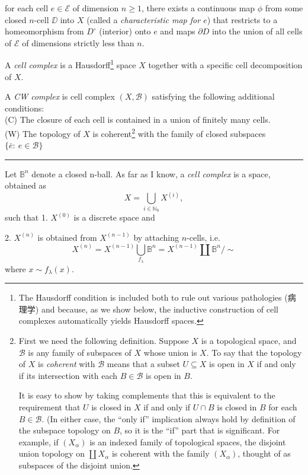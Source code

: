    for each cell $e\in \mathcal{E}$ of dimension $n\geq 1$, there exists a continuous map $\phi$
   from some closed $n$-cell $\DD$ into $X$ (called a {\it characteristic map for $e$}) that restricts to a homeomorphism from $D^{\circ}$ (interior) onto $e$ and maps $\partial D$ into the union of all cells of $\mathcal{E}$ of dimensions strictly less than $n$.\par
   A {\it cell complex} is a Hausdorff\footnote{The Hausdorff condition is included both to rule out various pathologies (病理学) and because, as we show below, the inductive construction of cell complexes automatically yields Hausdorff spaces.} space $X$ together with a specific cell decomposition of $X$.\par
   A {\it CW complex} is cell complex $(X,\mathcal{B})$ satisfying the following additional conditions:\\
   (C) The closure of each cell is contained in a union of finitely many cells.\\
   (W) The topology of $X$ is coherent\footnote{First we need the following definition. Suppose $X$ is a topological space, and $\mathcal{B}$ is any family of subspaces of $X$ whose union is $X$. To say that the topology of $X$ is {\it coherent} with $\mathcal{B}$ means that a subset $U\subseteq X$ is open in $X$ if and only if its intersection with each $B\in \mathcal{B}$ is open in $B$.\par 
   It is easy to show by taking complements that this is equivalent to the requirement that $U$ is closed in $X$ if and only if $U\cap B$ is closed in $B$ for each $B \in\mathcal{B}$. (In either case, the ``only if'' implication always hold by definition of the subspace topology on $B$, so it is the ``if'' part that is significant. For example, if $(X_{\alpha})$ is an indexed family of topological spaces, the disjoint union topology on $\coprod X_{\alpha}$ is coherent with the family $(X_{\alpha})$, thought of as subspaces of the disjoint union.} with the family of closed subspaces $\{\bar{e}:\ e\in \mathcal{B}\}$ \par
\vspace{3pt}
\hrule
\vspace{3pt}
Let $\mathbb{B}^n$ denote a closed n-ball. As far as I know, a {\it cell complex} is a space, obtained as \[X=\bigcup_{i\in\mathbb{N}_0} X^{(i)},\] 
such that
1. $X^{(0)}$ is a discrete space and

2. $X^{(n)}$ is obtained from $X^{(n-1)}$ by attaching $n$-cells, i.e.
\[X^{(n)}= X^{(n-1)}\bigcup_{f_{\lambda}}\mathbb{B}^n= X^{(n-1)}\coprod \mathbb{B}^n/\sim\]
where $x\sim f_\lambda(x)$.

